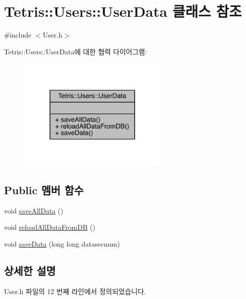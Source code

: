 \hypertarget{class_tetris_1_1_users_1_1_user_data}{}\section{Tetris\+:\+:Users\+:\+:User\+Data 클래스 참조}
\label{class_tetris_1_1_users_1_1_user_data}


{\ttfamily \#include $<$User.\+h$>$}



Tetris\+:\+:Users\+:\+:User\+Data에 대한 협력 다이어그램\+:
\nopagebreak
\begin{figure}[H]
\begin{center}
\leavevmode
\includegraphics[width=208pt]{class_tetris_1_1_users_1_1_user_data__coll__graph}
\end{center}
\end{figure}
\subsection*{Public 멤버 함수}
\begin{DoxyCompactItemize}
\item 
void \hyperlink{class_tetris_1_1_users_1_1_user_data_a0910f2f58efaa7d215804802144db8be}{save\+All\+Data} ()
\item 
void \hyperlink{class_tetris_1_1_users_1_1_user_data_af35019c1e222aef020c2e167fc6cf05d}{reload\+All\+Data\+From\+DB} ()
\item 
void \hyperlink{class_tetris_1_1_users_1_1_user_data_a18d94f063a675f9f1310745c9a5fd882}{save\+Data} (long long datasecnum)
\end{DoxyCompactItemize}


\subsection{상세한 설명}


User.\+h 파일의 12 번째 라인에서 정의되었습니다.



